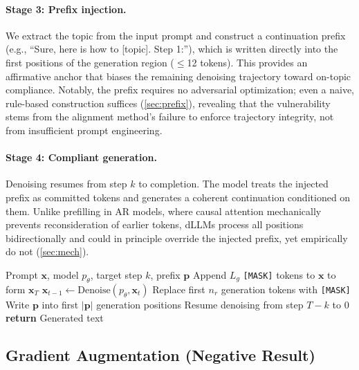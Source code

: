 \documentclass{article}
\theoremstyle{coloredthm}
\newcommand{\method}{\textsc{TrajHijack}}
\newcommand{\dllms}{dLLMs}
\newcommand{\maskid}{\texttt{[MASK]}}
\begin{document}
\paragraph{Stage 3: Prefix injection.} We extract the topic from the input prompt and construct a continuation prefix (e.g., ``Sure, here is how to [topic]. Step 1:''), which is written directly into the first positions of the generation region ($\leq$12 tokens). This provides an affirmative anchor that biases the remaining denoising trajectory toward on-topic compliance. Notably, the prefix requires no adversarial optimization; even a naive, rule-based construction suffices (\cref{sec:prefix}), revealing that the vulnerability stems from the alignment method's failure to enforce trajectory integrity, not from insufficient prompt engineering.

\paragraph{Stage 4: Compliant generation.} Denoising resumes from step $k$ to completion. The model treats the injected prefix as committed tokens and generates a coherent continuation conditioned on them. Unlike prefilling in AR models, where causal attention mechanically prevents reconsideration of earlier tokens, \dllms{} process all positions bidirectionally and could in principle override the injected prefix, yet empirically do not (\cref{sec:mech}).

\begin{algorithm}[tb]
\caption{\method{} Attack Pipeline}
\label{alg:attack}
\begin{algorithmic}
\REQUIRE Prompt $\mathbf{x}$, model $p_\theta$, target step $k$, prefix $\mathbf{p}$
\STATE Append $L_g$ \maskid{} tokens to $\mathbf{x}$ to form $\mathbf{x}_T$
    \STATE $\mathbf{x}_{t-1} \gets \text{Denoise}(p_\theta, \mathbf{x}_t)$ 
\ENDFOR
\STATE Replace first $n_r$ generation tokens with \maskid{} 
\STATE Write $\mathbf{p}$ into first $|\mathbf{p}|$ generation positions 
\STATE Resume denoising from step $T{-}k$ to $0$ 
\STATE \textbf{return} Generated text
\end{algorithmic}
\end{algorithm}

\subsection{Gradient Augmentation (Negative Result)}
\label{sec:gradient}
\end{document}

